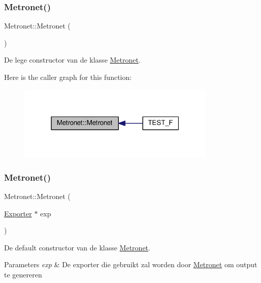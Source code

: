\subsubsection{\texorpdfstring{Metronet()}{Metronet()}\hspace{0.1cm}{\footnotesize\ttfamily [1/2]}}
{\footnotesize\ttfamily Metronet\+::\+Metronet (\begin{DoxyParamCaption}{ }\end{DoxyParamCaption})}



De lege constructor van de klasse \hyperlink{class_metronet}{Metronet}. 

Here is the caller graph for this function\+:\nopagebreak
\begin{figure}[H]
\begin{center}
\leavevmode
\includegraphics[width=268pt]{class_metronet_abdd205c39857ed1aabd104a6886cad45_icgraph}
\end{center}
\end{figure}
\mbox{\label{class_metronet_a2f8f40f437a1ae14ea78d306aaed6bd4}} 
\subsubsection{\texorpdfstring{Metronet()}{Metronet()}\hspace{0.1cm}{\footnotesize\ttfamily [2/2]}}
{\footnotesize\ttfamily Metronet\+::\+Metronet (\begin{DoxyParamCaption}\item[{\hyperlink{class_exporter}{Exporter} $\ast$}]{exp }\end{DoxyParamCaption})}



De default constructor van de klasse \hyperlink{class_metronet}{Metronet}. 


\begin{DoxyParams}{Parameters}
{\em exp} & De exporter die gebruikt zal worden door \hyperlink{class_metronet}{Metronet} om output te genereren \\
\hline
\end{DoxyParams}
\mbox{\label{class_metronet_afa96be4bf66f8d7dcf3f40a7487d2ea7}} 
